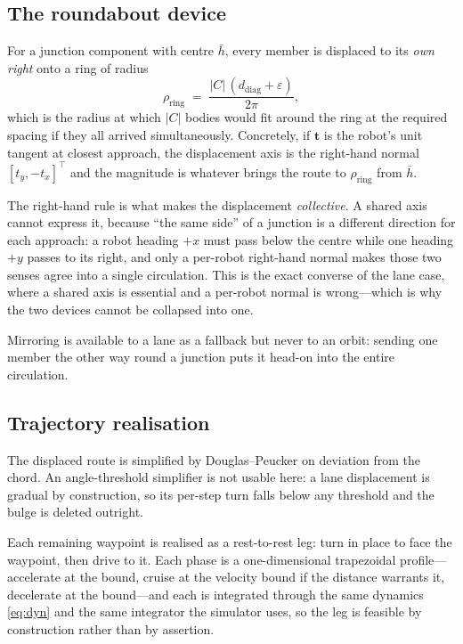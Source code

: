 \documentclass[conference]{IEEEtran}
\begin{document}
\subsection{The roundabout device}
\label{sec:orbit}

For a junction component with centre $\bar{h}$, every member is displaced to its
\emph{own right} onto a ring of radius
\begin{equation}
\rho_{\mathrm{ring}} \;=\; \frac{|C| \, (d_{\mathrm{diag}} + \varepsilon)}{2\pi},
\label{eq:ring}
\end{equation}
which is the radius at which $|C|$ bodies would fit around the ring at the required
spacing if they all arrived simultaneously. Concretely, if $\mathbf{t}$ is the robot's unit
tangent at closest approach, the displacement axis is the right-hand normal
$[t_y, -t_x]^\top$ and the magnitude is whatever brings the route to $\rho_{\mathrm{ring}}$
from $\bar{h}$.

The right-hand rule is what makes the displacement \emph{collective}. A shared axis cannot
express it, because ``the same side'' of a junction is a different direction for each
approach: a robot heading $+x$ must pass below the centre while one heading $+y$ passes to
its right, and only a per-robot right-hand normal makes those two senses agree into a single
circulation. This is the exact converse of the lane case, where a shared axis is essential
and a per-robot normal is wrong---which is why the two devices cannot be collapsed into one.

Mirroring is available to a lane as a fallback but never to an orbit: sending one member the
other way round a junction puts it head-on into the entire circulation.

\subsection{Trajectory realisation}
\label{sec:legs}

The displaced route is simplified by Douglas--Peucker \cite{douglas1973} on deviation from
the chord. An angle-threshold simplifier is not usable here: a lane displacement is gradual
by construction, so its per-step turn falls below any threshold and the bulge is deleted
outright.

Each remaining waypoint is realised as a rest-to-rest leg: turn in place to face the
waypoint, then drive to it. Each phase is a one-dimensional trapezoidal profile---accelerate
at the bound, cruise at the velocity bound if the distance warrants it, decelerate at the
bound---and each is integrated through the same dynamics \eqref{eq:dyn} and the same
integrator the simulator uses, so the leg is feasible by construction rather than by
assertion.
\end{document}
